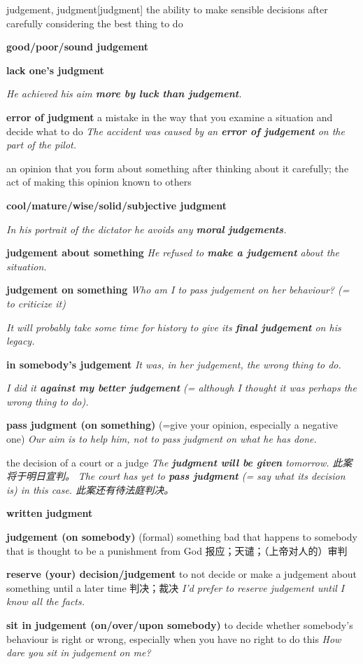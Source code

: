\begin{DefWord}{judgement, judgment}[judgment]
    the ability to make sensible decisions after carefully considering the best thing to do
    
    \textbf{good/poor/sound judgement}

    \textbf{lack one's judgment}

    \textit{He achieved his aim \textbf{more by luck than judgement}.}

    \textbf{error of judgment} a mistake in the way that you examine a situation and decide what to do
    \textit{The accident was caused by an \textbf{error of judgement} on the part of the pilot.}

    an opinion that you form about something after thinking about it carefully; the act of making this opinion known to others

    \textbf{cool/mature/wise/solid/subjective judgment}

    \textit{In his portrait of the dictator he avoids any \textbf{moral judgements}.}

    \textbf{judgement about something} \textit{He refused to \textbf{make a judgement} about the situation.}

    \textbf{judgement on something} \textit{Who am I to pass judgement on her behaviour? (= to criticize it)}

    \textit{It will probably take some time for history to give its \textbf{final judgement} on his legacy.}

    \textbf{in somebody's judgement} \textit{It was, in her judgement, the wrong thing to do.}

    \textit{I did it \textbf{against my better judgement} (= although I thought it was perhaps the wrong thing to do).}

    \textbf{pass judgment (on something)}
    (=give your opinion, especially a negative one)
     \textit{Our aim is to help him, not to pass judgment on what he has done.}



    the decision of a court or a judge
    \textit{The \textbf{judgment will be given} tomorrow. 此案将于明日宣判。}
    \textit{The court has yet to \textbf{pass judgment} (= say what its decision is) in this case. 此案还有待法庭判决。}

    \textbf{written judgment}

    \textbf{judgement (on somebody)} (formal) something bad that happens to somebody that is thought to be a punishment from God 报应；天谴；（上帝对人的）审判

    \textbf{reserve (your) decision/judgement}
    to not decide or make a judgement about something until a later time 判决；裁决
    \textit{I'd prefer to reserve judgement until I know all the facts.}

    \textbf{sit in judgement (on/over/upon somebody)}
    to decide whether somebody’s behaviour is right or wrong, especially when you have no right to do this
    \textit{How dare you sit in judgement on me?}
\end{DefWord}


